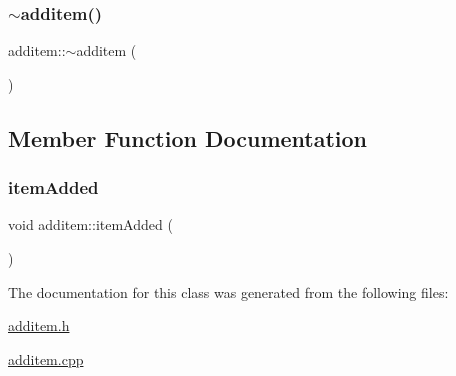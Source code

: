 \mbox{\label{classadditem_ada0331b13159bc5c2077a897ebc759b4}} 
\subsubsection{\texorpdfstring{$\sim$additem()}{~additem()}}
{\footnotesize\ttfamily additem\+::$\sim$additem (\begin{DoxyParamCaption}{ }\end{DoxyParamCaption})}



\subsection{Member Function Documentation}
\mbox{\label{classadditem_aebf196dafb07560ccaae7e5a45765db3}} 
\subsubsection{\texorpdfstring{item\+Added}{itemAdded}}
{\footnotesize\ttfamily void additem\+::item\+Added (\begin{DoxyParamCaption}{ }\end{DoxyParamCaption})\hspace{0.3cm}{\ttfamily [signal]}}



The documentation for this class was generated from the following files\+:\begin{DoxyCompactItemize}
\item 
\hyperlink{additem_8h}{additem.\+h}\item 
\hyperlink{additem_8cpp}{additem.\+cpp}\end{DoxyCompactItemize}
